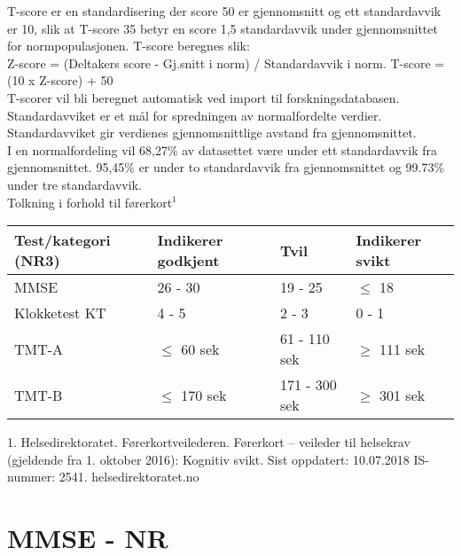 \documentclass[pdf,  style=code128, globalid=OMRCRFv5.0.3, english, stamp, pagemark, oneside]{sdapsclassic}
\begin{document}
\begin{questionnaire}
   \begin{tcolorbox}
     T-score er en standardisering der score 50 er gjennomsnitt og ett standardavvik er 10, slik at T-score 35 betyr en score 1,5 standardavvik under gjennomsnittet for normpopulasjonen. T-score beregnes slik:\\
     Z-score = (Deltakers score - Gj.snitt i norm) / Standardavvik i norm. T-score = (10 x Z-score) + 50\\
     T-scorer vil bli beregnet automatisk ved import til forskningsdatabasen.\\[0.3em]
     Standardavviket er et mål for spredningen av normalfordelte verdier. Standardavviket gir verdienes gjennomsnittlige avstand fra gjennomsnittet.\\
     I en normalfordeling vil 68,27\% av datasettet være under ett standardavvik fra gjennomsnittet. 95,45\% er under to standardavvik fra gjennomsnittet og 99.73\% under tre standardavvik.\\

     Tolkning i forhold til førerkort$^1$\\[0.2em]
     \begin{tabular}{|l |l |l |l|}
       \hline
       \textbf{Test/kategori} (NR3) & Indikerer godkjent & Tvil & Indikerer svikt\\
       \hline
       MMSE & 26 - 30 & 19 - 25 &  $\leq$ 18 \\
       \hline
       Klokketest KT & 4 - 5 & 2 - 3 & 0 - 1 \\
       \hline
       TMT-A & $\leq$ 60 sek & 61 - 110 sek & $\geq$ 111 sek \\
       \hline
       TMT-B & $\leq$ 170 sek & 171 - 300 sek & $\geq$ 301 sek \\
       \hline
     \end{tabular}

      \vspace{0.4em}
      \footnotesize
      1. Helsedirektoratet. Førerkortveilederen. Førerkort – veileder til helsekrav (gjeldende fra 1. oktober 2016): Kognitiv svikt. Sist oppdatert: 10.07.2018 IS-nummer: 2541. helsedirektoratet.no
      \normalsize
   \end{tcolorbox}

    \section{MMSE - NR}



\end{questionnaire}
\end{document}
